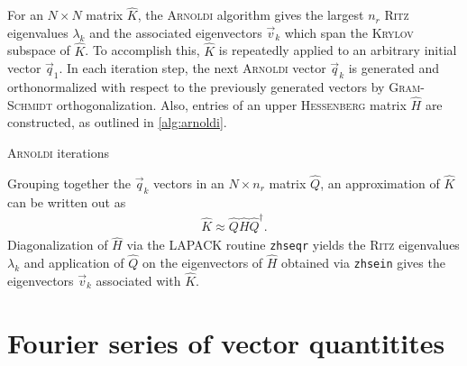 For an $N \times N$ matrix $\hat{K}$, the \textsc{Arnoldi} algorithm gives the largest $n_{r}$ \textsc{Ritz} eigenvalues $\lambda_{k}$  and the associated eigenvectors $\vec{v}_{k}$ which span the \textsc{Krylov} subspace of $\hat{K}$. To accomplish this, $\hat{K}$ is repeatedly applied to an arbitrary initial vector $\vec{q}_{1}$. In each iteration step, the next \textsc{Arnoldi} vector $\vec{q}_{k}$ is generated and orthonormalized with respect to the previously generated vectors by \textsc{Gram}-\textsc{Schmidt} orthogonalization. Also, entries of an upper \textsc{Hessenberg} matrix $\hat{H}$ are constructed, as outlined in \cref{alg:arnoldi}.
\begin{algorithm}
  \caption{\textsc{Arnoldi} iterations}
  \label{alg:arnoldi}
  \begin{algorithmic}[1]
      \EndFor
    \EndFor
  \end{algorithmic}
\end{algorithm}
Grouping together the $\vec{q}_{k}$ vectors in an $N \times n_{r}$ matrix $\hat{Q}$, an approximation of $\hat{K}$ can be written out as
\begin{gather}
  \hat{K} \approx \hat{Q} \hat{H} \hat{Q}^{\dagger}.
\end{gather}
Diagonalization of $\hat{H}$ via the LAPACK routine \texttt{zhseqr} yields the \textsc{Ritz} eigenvalues $\lambda_{k}$ and application of $\hat{Q}$ on the eigenvectors of $\hat{H}$ obtained via \texttt{zhsein} gives the eigenvectors $\vec{v}_{k}$ associated with $\hat{K}$.

\section{Fourier series of vector quantitites}


